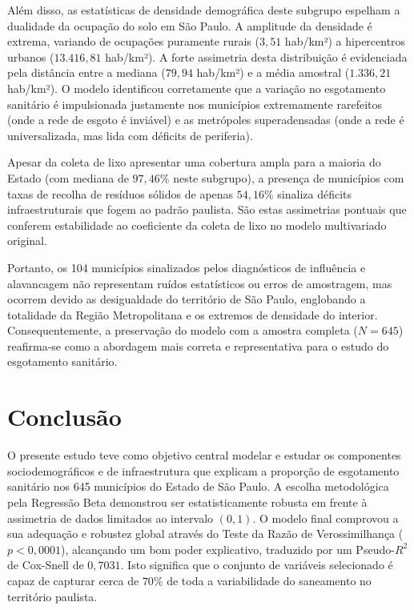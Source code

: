 \documentclass[12pt, a4paper]{article}
\begin{document}
Além disso, as estatísticas de densidade demográfica deste subgrupo espelham a dualidade da ocupação do solo em São Paulo. A amplitude da densidade é extrema, variando de ocupações puramente rurais ($3,51$ hab/km²) a hipercentros urbanos ($13.416,81$ hab/km²). A forte assimetria desta distribuição é evidenciada pela distância entre a mediana ($79,94$ hab/km²) e a média amostral ($1.336,21$ hab/km²). O modelo identificou corretamente que a variação no esgotamento sanitário é impulsionada justamente nos municípios extremamente rarefeitos (onde a rede de esgoto é inviável) e as metrópoles superadensadas (onde a rede é universalizada, mas lida com déficits de periferia).

Apesar da coleta de lixo apresentar uma cobertura ampla para a maioria do Estado (com mediana de $97,46\%$ neste subgrupo), a presença de municípios com taxas de recolha de resíduos sólidos de apenas $54,16\%$ sinaliza déficits infraestruturais que fogem ao padrão paulista. São estas assimetrias pontuais que conferem estabilidade ao coeficiente da coleta de lixo no modelo multivariado original.

Portanto, os 104 municípios sinalizados pelos diagnósticos de influência e alavancagem não representam ruídos estatísticos ou erros de amostragem, mas ocorrem devido as desigualdade do território de São Paulo, englobando a totalidade da Região Metropolitana e os extremos de densidade do interior. Consequentemente, a preservação do modelo com a amostra completa ($N=645$) reafirma-se como a abordagem mais correta e representativa para o estudo do esgotamento sanitário.

\section{Conclusão}

O presente estudo teve como objetivo central modelar e estudar os componentes sociodemográficos e de infraestrutura que explicam a proporção de esgotamento sanitário nos 645 municípios do Estado de São Paulo. A escolha metodológica pela Regressão Beta demonstrou ser estatisticamente robusta em frente à assimetria de dados limitados ao intervalo $(0,1)$. O modelo final comprovou a sua adequação e robustez global através do Teste da Razão de Verossimilhança ($p < 0,0001$), alcançando um bom poder explicativo, traduzido por um Pseudo-$R^2$ de Cox-Snell de $0,7031$. Isto significa que o conjunto de variáveis selecionado é capaz de capturar cerca de $70\%$ de toda a variabilidade do saneamento no território paulista.
\end{document}
